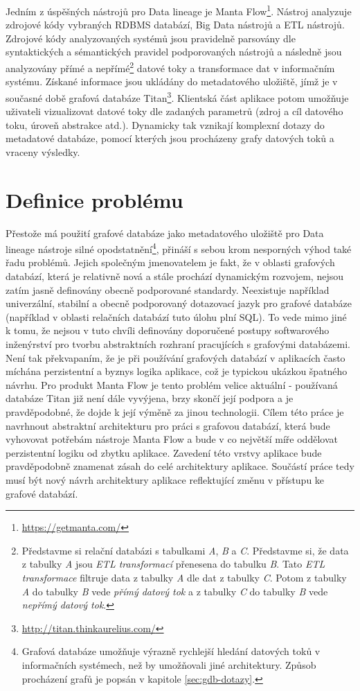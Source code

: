 Jedním z úspěšných nástrojů pro Data lineage je Manta Flow\footnote{\url{https://getmanta.com/}}. Nástroj analyzuje zdrojové kódy vybraných RDBMS databází, Big Data nástrojů a ETL nástrojů. 
Zdrojové kódy analyzovaných systémů jsou pravidelně parsovány dle syntaktických a sémantických pravidel podporovaných nástrojů a následně jsou analyzovány přímé a nepřímé\footnote{Představme si relační databázi s tabulkami \textit{A}, \textit{B} a \textit{C}. Představme si, že data z tabulky \textit{A} jsou \textit{ETL transformací} přenesena do tabulku \textit{B}. Tato \textit{ETL transformace} filtruje data z tabulky \textit{A} dle dat z tabulky \textit{C}. Potom z tabulky \textit{A} do tabulky \textit{B} vede \textit{přímý datový tok} a z tabulky \textit{C} do tabulky \textit{B} vede \textit{nepřímý datový tok}.} datové toky a transformace dat v informačním systému. Získané informace jsou ukládány do metadatového uložiště, jímž je v současné době grafová databáze Titan\footnote{\url{http://titan.thinkaurelius.com/}}. Klientská část aplikace potom umožňuje uživateli vizualizovat datové toky dle zadaných parametrů (zdroj a cíl datového toku, úroveň abstrakce atd.). Dynamicky tak vznikají komplexní dotazy do metadatové databáze, pomocí kterých jsou procházeny grafy datových toků a vraceny výsledky.    

\section{Definice problému}
Přestože má použití grafové databáze jako metadatového uložiště pro Data lineage nástroje silné opodstatnění\footnote{Grafová databáze umožňuje výrazně rychlejší hledání datových toků v informačních systémech, než by umožňovali jiné architektury. Způsob procházení grafů je popsán v kapitole \ref{sec:gdb-dotazy}.}, přináší s sebou krom nesporných výhod také řadu problémů. Jejich společným jmenovatelem je fakt, že v oblasti grafových databází, která je relativně nová a stále prochází dynamickým rozvojem, nejsou zatím jasně definovány obecně podporované standardy. Neexistuje například univerzální, stabilní a obecně podporovaný dotazovací jazyk pro grafové databáze (například v oblasti relačních databází tuto úlohu plní SQL). To vede mimo jiné k tomu, že nejsou v tuto chvíli definovány doporučené postupy softwarového inženýrství pro tvorbu abstraktních rozhraní pracujících s grafovými databázemi. Není tak překvapaním, že je při používání grafových databází v aplikacích často míchána perzistentní a byznys logika aplikace, což je typickou ukázkou špatného návrhu\cite{Taylor09}. Pro produkt Manta Flow je tento problém velice aktuální - používaná databáze Titan již není dále vyvýjena, brzy skončí její podpora \cite{Titan04} a je pravděpodobné, že dojde k její výměně za jinou technologii. Cílem této práce je navrhnout abstraktní architekturu pro práci s grafovou databází, která bude vyhovovat potřebám nástroje Manta Flow a bude v co největší míře oddělovat perzistentní logiku od zbytku aplikace. Zavedení této vrstvy aplikace bude pravděpodobně znamenat zásah do celé architektury aplikace. Součástí práce tedy musí být nový návrh architektury aplikace reflektující změnu v přístupu ke grafové databází. 

